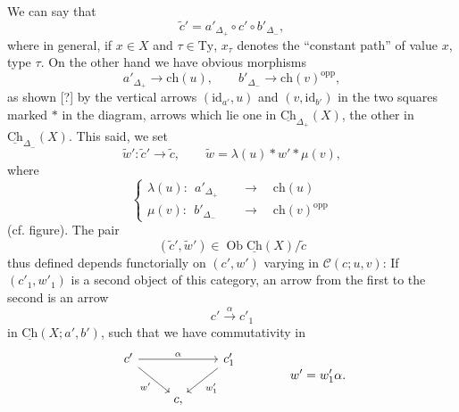 \documentclass[11pt]{article}
\newcommand{\printedpage}[1]{\marginpar{\footnotesize p.~#1}}
\newcommand{\msp}[1]{\marginpar{\footnotesize [#1]}}
\newcommand{\Ch}{\underline{\mathrm{Ch}}}
\newcommand{\cC}{\mathcal{C}}
\newcommand{\Ob}{\operatorname{Ob}}
\begin{document}
\msp{page 163}
We can say that
\[
\tilde{c}' = a'_{\Delta_{+}} \circ c' \circ b'_{\Delta_{-}},
\]
where in general, if $x \in X$ and $\tau \in \mathrm{Ty}$, $x_{\tau}$ denotes the ``constant path'' of value $x$, type $\tau$. On the other hand we have obvious morphisms
\[
a'_{\Delta_{+}} \longrightarrow \mathrm{ch}(u), \qquad b'_{\Delta_{-}} \longrightarrow \mathrm{ch}(v)^{\mathrm{opp}},
\]
as shown [?] by the vertical arrows $(\mathrm{id}_{a'},u)$ and $(v,\mathrm{id}_{b'})$ in the two squares marked $\ast$ in the diagram, arrows which lie one in $\Ch_{\Delta_{+}}(X)$, the other in $\Ch_{\Delta_{-}}(X)$. This said, we set
\[
\tilde{w}' : \tilde{c}' \longrightarrow \tilde{c}, \qquad \tilde{w} = \lambda(u) \ast w' \ast \mu(v), %
\]
where
\[
\left\{
\begin{aligned}
\lambda(u) :\ \ a'_{\Delta_{+}} &\quad\longrightarrow\quad \mathrm{ch}(u) \\
\mu(v) :\ \ b'_{\Delta_{-}} &\quad\longrightarrow\quad \mathrm{ch}(v)^{\mathrm{opp}}
\end{aligned}
\right.
\]
\printedpage{102}
(cf. figure). The pair
\[
(\tilde{c}',\tilde{w}') \in \Ob \Ch(X)/\tilde{c}
\]
thus defined depends functorially on $(c',w')$ varying in $\cC(c;u,v)$: If $(c'_1,w'_1)$ is a second object of this category, an arrow from the first to the second is an arrow
\[
c' \xrightarrow{\alpha} c'_1
\]
in $\Ch(X;a',b')$, such that we have commutativity in
\[
\begin{tikzcd}
c' \ar[rr,"\alpha"] \ar[dr,"w'"'] & & c'_1 \ar[dl,"w'_1"] \\
& c, &
\end{tikzcd}
\qquad\qquad w' = w'_1\alpha.
\]
\end{document}
